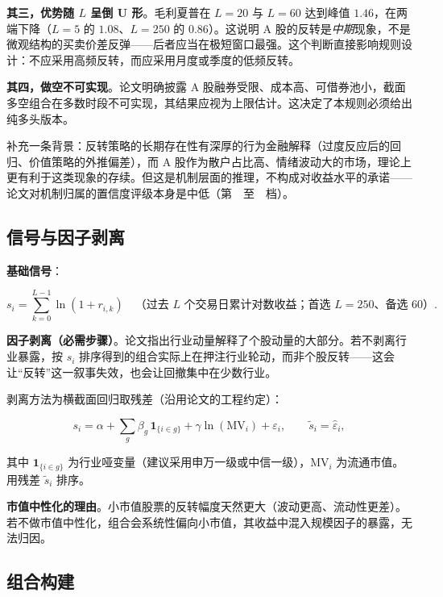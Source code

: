 \textbf{其三，优势随 $L$ 呈倒 U 形}。毛利夏普在 $L=20$ 与 $L=60$ 达到峰值 $1.46$，在两端下降（$L=5$ 的 $1.08$、$L=250$ 的 $0.86$）。这说明 A 股的反转是\emph{中期}现象，不是微观结构的买卖价差反弹——后者应当在极短窗口最强。这个判断直接影响规则设计：不应采用高频反转，而应采用月度或季度的低频反转。

\textbf{其四，做空不可实现}。论文明确披露 A 股融券受限、成本高、可借券池小，截面多空组合在多数时段不可实现，其结果应视为上限估计。这决定了本规则必须给出纯多头版本。

补充一条背景：反转策略的长期存在性有深厚的行为金融解释（过度反应后的回归\cite{debondt1985}、价值策略的外推偏差\cite{lakonishok1994}），而 A 股作为散户占比高、情绪波动大的市场，理论上更有利于这类现象的存续。但这是机制层面的推理，不构成对收益水平的承诺——论文对机制归属的置信度评级本身是中低（第~\confmid~至~\conflow~档）。

\subsection{信号与因子剥离}

\textbf{基础信号}：

\begin{equation}
s_i=\sum_{k=0}^{L-1}\ln\left(1+r_{i,k}\right) \quad\text{（过去 $L$ 个交易日累计对数收益；首选 $L=250$、备选 $60$）}.
\end{equation}

\textbf{因子剥离（必需步骤）}。论文指出行业动量解释了个股动量的大部分\cite{moskowitzgrinblatt1999}。若不剥离行业暴露，按 $s_i$ 排序得到的组合实际上在押注行业轮动，而非个股反转——这会让“反转”这一叙事失效，也会让回撤集中在少数行业。

剥离方法为横截面回归取残差（沿用论文的工程约定）：

\begin{equation}
s_i=\alpha+\sum_g\beta_g\,\mathbf 1_{\{i\in g\}}+\gamma\ln(\mathrm{MV}_i)+\varepsilon_i,
\qquad \tilde s_i=\hat\varepsilon_i ,
\end{equation}

其中 $\mathbf 1_{\{i\in g\}}$ 为行业哑变量（建议采用申万一级或中信一级），$\mathrm{MV}_i$ 为流通市值。用残差 $\tilde s_i$ 排序。

\textbf{市值中性化的理由}。小市值股票的反转幅度天然更大（波动更高、流动性更差）。若不做市值中性化，组合会系统性偏向小市值，其收益中混入规模因子的暴露，无法归因。

\subsection{组合构建}

